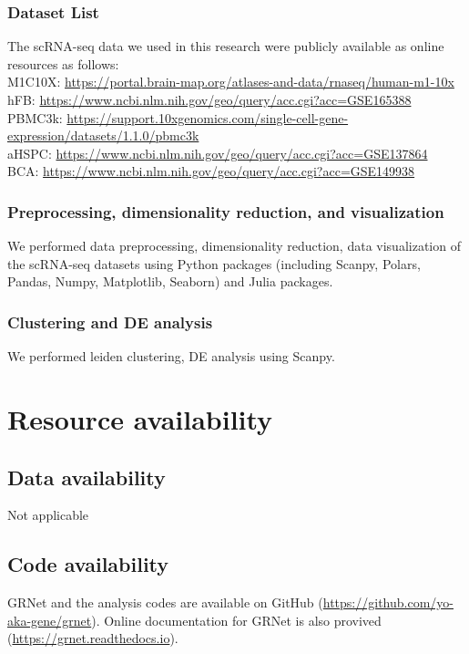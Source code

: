 \documentclass{article}
\begin{document}
\subsubsection*{Dataset List}
The scRNA-seq data we used in this research were publicly available as online
resources as follows:\\
M1C10X: \url{https://portal.brain-map.org/atlases-and-data/rnaseq/human-m1-10x}\\
hFB: \url{https://www.ncbi.nlm.nih.gov/geo/query/acc.cgi?acc=GSE165388}\\
PBMC3k: \url{https://support.10xgenomics.com/single-cell-gene-expression/datasets/1.1.0/pbmc3k}\\
aHSPC: \url{https://www.ncbi.nlm.nih.gov/geo/query/acc.cgi?acc=GSE137864}\\
BCA: \url{https://www.ncbi.nlm.nih.gov/geo/query/acc.cgi?acc=GSE149938}\\
\subsubsection*{Preprocessing, dimensionality reduction, and visualization}
We performed data preprocessing, dimensionality reduction, data visualization
of the scRNA-seq datasets using Python packages (including Scanpy\cite{scanpy}, Polars,
Pandas\cite{pandas}, Numpy, Matplotlib\cite{matplotlib}, Seaborn\cite{seaborn}) and Julia packages.
\subsubsection*{Clustering and DE analysis}
We performed leiden clustering, DE analysis using Scanpy.

\section*{Resource availability}
\subsection*{Data availability}
Not applicable
\subsection*{Code availability}
GRNet and the analysis codes are available on GitHub (\url{https://github.com/yo-aka-gene/grnet}).
Online documentation for GRNet is also provived (\url{https://grnet.readthedocs.io}).

\end{document}
